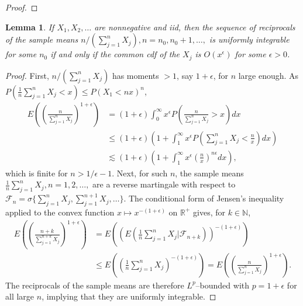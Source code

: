 \documentclass[12pt]{article}
\newcommand{\E}{E}
\renewcommand{\P}{P}
\newtheorem{lemma}{Lemma}
\newcommand{\x}{X}
\begin{document}
\begin{appendices}
\begin{proof}
    
      \end{proof}


  \begin{lemma}\label{lemma:1}
    If $\x_1,\x_2,\ldots$ are nonnegative and iid, then the sequence
    of reciprocals of the sample means
    $n/(\sum_{j=1}^n\x_j),n=n_0,n_0+1,\ldots,$ is uniformly integrable
    for some $n_0$ if and only if the common cdf of the $\x_j$ is
    $O(x^\epsilon)$ for some $\epsilon>0$.
  \end{lemma}

  \begin{proof}
    First, $n/(\sum_{j=1}^n\x_j)$ has moments $>1$, say $1+\epsilon$, for $n$ large enough. As $\P(\frac{1}{n}\sum_{j=1}^n\x_j<x)\le \P(\x_1<nx)^n$,
    \begin{align}
      \E\left(\left(\frac{n}{\sum_{j=1}^n\x_j}\right)^{1+\epsilon}\right) &=
                                                      (1+\epsilon)\int_0^\infty x^\epsilon\P\left(\frac{n}{\sum_{j=1}^n\x_j}>x\right)dx\\
                                                    &\le(1+\epsilon)\left(1+\int_1^\infty x^\epsilon\P\left(\sum_{j=1}^n\x_j<\frac{n}{x}\right)dx\right)\\
                                                    &\lesssim (1+\epsilon)\left(1+\int_1^\infty x^\epsilon\left(\frac{n}{x}\right)^{n\epsilon}dx\right),
    \end{align}
    which is finite for $n > 1/\epsilon-1$.
    Next, for such $n$,  the sample means $\frac{1}{n}\sum_{j=1}^n\x_j,n=1,2,\ldots,$ are a reverse martingale with respect to $\mathcal{F}_n=\sigma\{\sum_{j=1}^n\x_j,\sum_{j=1}^{n+1}\x_j,\ldots\}$. The conditional form of Jensen's inequality applied to the convex function $x\mapsto x^{-(1+\epsilon)}$ on $\mathbb{R}^+$ gives, for $k\in\mathbb{N}$,
    \begin{align}
      \E\left(\left(\frac{n+k}{\sum_{j=1}^{n+k}\x_j}\right)^{1+\epsilon}\right) &= \E\left(\left(\E\left(\frac{1}{n}\sum_{j=1}^n\x_j\bigg\vert\mathcal{F}_{n+k}\right)\right)^{-(1+\epsilon)}\right)\\
                                                                                &\le \E\left(\left(\frac{1}{n}\sum_{j=1}^n\x_j\right)^{-(1+\epsilon)}\right) =
                                                                                  \E\left(\left(\frac{n}{\sum_{j=1}^{n}\x_j}\right)^{1+\epsilon}\right).
    \end{align}
    The reciprocals of the sample means are therefore $L^p$--bounded with $p=1+\epsilon$ for all large $n$, implying that they are uniformly integrable.


\end{proof}
\end{appendices}
\end{document}
